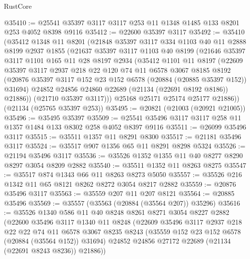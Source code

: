 \begin{lexlean}{RustCore}
\begin{coremodule}
@35410 := @25541 @35397 @3117 @3117 @253 @11 @1348 @1485 @133 @8201 @253 @4052 @8398 @9116
@35412 := @22600 @35397 @3117
@35492 := @35410
    (@35412
      @1348
      @11
      @8201
      (@21848
        @35397
        @3117
        @334
        @1103
        @40
        @11
        @2888
        @8199
        @2937
        @1855
        (@21637
          @35397
          @3117
          @1103
          @40
          @8199
          (@21646
            @35397
            @3117
            @1101
            @165
            @11
            @28
            @8197
            @2934
            (@35412
              @1101
              @11
              @8197
              (@22609
                @35397
                @3117
                @2937
                @218
                @22
                @120
                @74
                @11
                @6578
                @3067
                @8185
                @8192
                (@20876 @35397 @3117 @152 @23 @152 @6578 (@20884 (@20885 @35397 @152)) @31694)
                @24852
                @24856
                @24860
                @22689
                (@21134 (@22691 @8192 @8186))
                @21886))
            (@21710 @35397 @3117)))
        @25168
        @25171
        @25174
        @25177
        @21886))
    (@21134 (@25765 @35397 @253))
@35495 := @20821 (@21003 (@20921 @21005))
@35496 := @35495 @35397
@35509 := @25541 @35496 @3117 @3117 @258 @11 @1357 @1484 @133 @8302 @258 @4052 @8397 @9116
@35511 := @26099 @35496 @3117
@35515 := @35511 @1357 @11 @8291 @8300
@35517 := @21181 @35496 @3117
@35524 := @35517 @907 @1356 @65 @11 @8291 @8298 @5324
@35526 := @21194 @35496 @3117
@35536 := @35526 @1352 @1355 @11 @40 @8277 @8290 @8297 @3054 @8209 @2882
@35540 := @35511 @1352 @11 @8263 @8275
@35547 := @35517 @874 @1343 @66 @11 @8263 @8273 @5050
@35557 := @35526 @216 @1342 @11 @65 @8121 @8262 @8272 @3054 @8217 @2882
@35559 := @20876 @35496 @3117
@35563 := @35559 @207 @11 @207 @8121
@35564 := @20885 @35496
@35569 := @35557 (@35563 (@20884 (@35564 @207)) @35296)
@35616 := @35526
    @1340
    @586
    @11
    @40
    @8248
    @8261
    @8271
    @3054
    @8227
    @2882
    (@22600
      @35496
      @3117
      @1340
      @11
      @8248
      (@22609
        @35496
        @3117
        @2937
        @218
        @22
        @22
        @74
        @11
        @6578
        @3067
        @8235
        @8243
        (@35559 @152 @23 @152 @6578 (@20884 (@35564 @152)) @31694)
        @24852
        @24856
        @27172
        @22689
        (@21134 (@22691 @8243 @8236))
        @21886))

\end{coremodule}
\end{lexlean}
